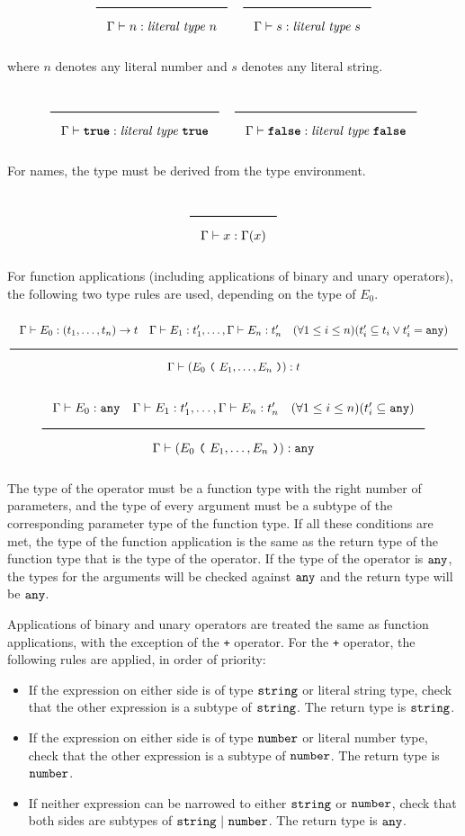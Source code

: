 \noindent
\[
  \Rule{}{\Gamma \vdash n : \textit{literal type}\ n}
  \quad
  \Rule{}{\Gamma \vdash s : \textit{literal type}\ s}
\]
\noindent

where $n$ denotes any literal number and $s$ denotes any literal string.

\noindent
\[
  \Rule{}{\Gamma \vdash \TruE : \textit{literal type}\ \TruE}
  \quad
  \Rule{}{\Gamma \vdash \FalsE : \textit{literal type}\ \FalsE}
\]
\noindent

For names, the type must be derived from the type environment.

\noindent
\[
  \Rule{}{\Gamma \vdash x : \Gamma(x)}
\]
\noindent

For function applications (including applications of binary and unary operators), the following two type rules are used, depending on the type of $E_0$.

\noindent
\[
\Rule{\Gamma \vdash E_0 : (t_1, \ldots, t_n) \rightarrow t \quad \Gamma \vdash E_1 : t'_1, \ldots,  \Gamma \vdash E_n : t'_n
  \quad (\forall 1 \leq i \leq n)(t'_i \subseteq t_i \vee t'_i = \Any)}{\Gamma \vdash (E_0\ \Lp \ E_1, \ldots, E_n\ \Rp) : t}
\]
\noindent
\[
  \Rule{\Gamma \vdash E_0 : \Any \quad \Gamma \vdash E_1 : t'_1, \ldots,  \Gamma \vdash E_n : t'_n
  \quad (\forall 1 \leq i \leq n)(t'_i \subseteq \Any)}{\Gamma \vdash (E_0\ \Lp \ E_1, \ldots, E_n\ \Rp) : \Any}
\]
\noindent

The type of the operator must be a function type with the right number of parameters,
and the type of every argument must be a subtype of the corresponding parameter type of the function type.
If all these conditions are met, the type of the function application is the same
as the return type of the function type that is the type of the operator.
If the type of the operator is $\texttt{any}$, the types for the arguments will be checked against $\texttt{any}$ and the return type will be $\texttt{any}$.

Applications of binary and unary operators are treated the same as function applications, with the exception of the \texttt{+} operator.
For the \texttt{+} operator, the following rules are applied, in order of priority:

\begin{itemize}
\item{If the expression on either side is of type $\texttt{string}$ or literal string type,
  check that the other expression is a subtype of $\texttt{string}$. The return type is $\texttt{string}$.}
\item{If the expression on either side is of type $\texttt{number}$ or literal number type,
  check that the other expression is a subtype of $\texttt{number}$. The return type is $\texttt{number}$.}
\item{If neither expression can be narrowed to either $\texttt{string}$ or $\texttt{number}$, check that both sides are subtypes of 
  $\texttt{string}\ |\ \texttt{number}$. The return type is $\texttt{any}$.}
\end{itemize}

